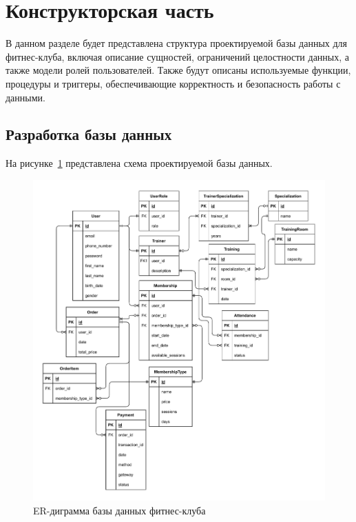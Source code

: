 \section{Конструкторская часть}

В данном разделе будет представлена структура проектируемой базы данных для фитнес-клуба, включая описание сущностей, ограничений целостности данных, а также модели ролей пользователей. Также будут описаны используемые функции, процедуры и триггеры, обеспечивающие корректность и безопасность работы с данными.

\subsection{Разработка базы данных}

На рисунке~\ref{fig:db-er} представлена схема проектируемой базы данных.

\begin{figure}[ht!]
	\begin{center}
		\includegraphics[scale=0.68]{./diag/db-er.pdf}
	\end{center}
	\caption{ER-диграмма базы данных фитнес-клуба}
	\label{fig:db-er}
\end{figure}

